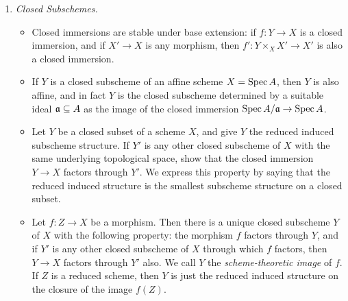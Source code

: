 \documentclass[a4paper]{article}
\begin{document}
\begin{enumerate} [label=\textbf{\arabic*.}, leftmargin=0em]
    \item[\textbf{11.}] \textit{Closed Subschemes.}
          \begin{itemize} [leftmargin=0cm]
              \item[(a)] Closed immersions are stable under base extension: if $f : Y \to X$ is a closed immersion, and if $X' \to X$ is any morphism, then $f' : Y \times_X X' \to X'$ is also a closed immersion.

              \item[(b)] If $Y$ is a closed subscheme of an affine scheme $X = \operatorname{Spec}{A}$, then $Y$ is also affine, and in fact $Y$ is the closed subscheme determined by a suitable ideal $\mathfrak{a} \subseteq A$ as the image of the closed immersion $\operatorname{Spec}{A / \mathfrak{a}} \to \operatorname{Spec}{A}$.

              \item[(c)] Let $Y$ be a closed subset of a scheme $X$, and give $Y$ the reduced induced subscheme structure. If $Y'$ is any other closed subscheme of $X$ with the same underlying topological space, show that the closed immersion $Y \to X$ factors through $Y'$. We express this property by saying that the reduced induced structure is the smallest subscheme structure on a closed subset.

              \item[(d)] Let $f : Z \to X$ be a morphism. Then there is a unique closed subscheme $Y$ of $X$ with the following property: the morphism $f$ factors through $Y$, and if $Y'$ is any other closed subscheme of $X$ through which $f$ factors, then $Y \to X$ factors through $Y'$ also. We call $Y$ the \textit{scheme-theoretic image} of $f$. If $Z$ is a reduced scheme, then $Y$ is just the reduced induced structure on the closure of the image $f(Z)$.
          \end{itemize}


\end{enumerate}
\end{document}
